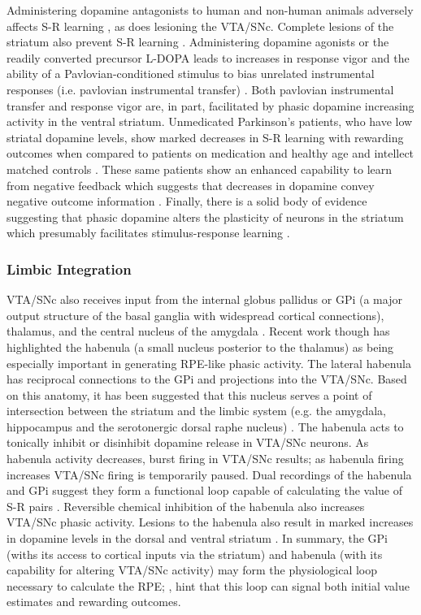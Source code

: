 \documentclass[doc,12pt]{apa}        %
\begin{document}
Administering dopamine antagonists to human and non-human animals adversely affects S-R learning \cite{Pizzagalli:2010p7205}, as does lesioning the VTA/SNc.  Complete lesions of the striatum also prevent S-R learning \cite{Packard:2002p5074}.  Administering dopamine agonists or the readily converted precursor L-DOPA leads to increases in response vigor and the ability of a Pavlovian-conditioned stimulus to bias unrelated instrumental responses (i.e. pavlovian instrumental transfer) \cite{Winterbauer:2007p6352}. Both pavlovian instrumental transfer and response vigor are, in part, facilitated by phasic dopamine increasing activity in the ventral striatum.  Unmedicated Parkinson's patients, who have low striatal dopamine levels, show marked decreases in S-R learning with rewarding outcomes when compared to patients on medication and healthy age and intellect matched controls \cite{Pizzagalli:2010p7205}.  These same patients show an enhanced capability to learn from negative feedback which suggests that decreases in dopamine convey negative outcome information \cite{Frank:2004p4709}.  Finally, there is a solid body of evidence suggesting that phasic dopamine alters the plasticity of neurons in the striatum which presumably facilitates stimulus-response learning \cite{Calabresi:2007p4284}.

\subsubsection{Limbic Integration}
\label{sub:limbic_inte}
VTA/SNc also receives input from the internal globus pallidus or GPi (a major output structure of the basal ganglia with widespread cortical connections), thalamus, and the central nucleus of the amygdala \cite{Botvinick:2008p6594}.  Recent work though has highlighted the habenula (a small nucleus posterior to the thalamus) as being especially important in generating RPE-like phasic activity.  The lateral habenula has reciprocal connections to the GPi and projections into the VTA/SNc. Based on this anatomy, it has been suggested that this nucleus serves a point of intersection between the striatum and the limbic system (e.g. the amygdala, hippocampus and the serotonergic dorsal raphe nucleus) \cite{Hikosaka:2008p4455}. The habenula acts to tonically inhibit or disinhibit dopamine release in VTA/SNc neurons.  As habenula activity decreases, burst firing in VTA/SNc results; as habenula firing increases VTA/SNc firing is temporarily paused.  Dual recordings of the habenula and GPi suggest they form a functional loop capable of calculating the value of S-R pairs \cite{BrombergMartin:2010p7221}.  Reversible chemical inhibition of the habenula also increases VTA/SNc phasic activity.  Lesions to the habenula also result in marked increases in dopamine levels in the dorsal and ventral striatum \cite{BrombergMartin:2010p7221}.  In summary, the GPi (withs its access to cortical inputs via the striatum) and habenula (with its capability for altering VTA/SNc activity) may form the physiological loop necessary to calculate the RPE; , hint that this loop can signal both initial value estimates and rewarding outcomes.
\end{document}
